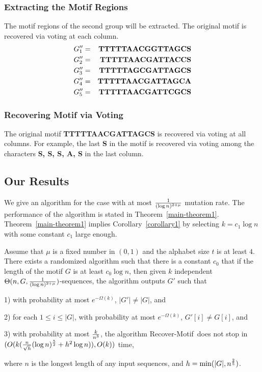 \documentclass[11pt]{article}
\newcommand{\algmnam}{Recover-Motif}
\begin{document}
\subsubsection{Extracting the Motif Regions}

The motif regions of the second group will be extracted. The
original motif is recovered via voting at each column.
\begin{eqnarray*}
G_1''&=&{\Large\bf TTTTTAACG{\small{G} }TTAGCS}\\
G_2''&=&{\Large\bf TTTTTAACGATTA{\small{C}}CS}\\
G_3''&=&{\Large\bf TTTTTA{\small{G}}CGATTAGCS}\\
G_4''&=&{\Large\bf TTTTTAACGATTAGC{\small{A}}}\\
G_5''&=&{\Large\bf TTTTTAACGATT{\small{C}}GCS}
\end{eqnarray*}


\subsubsection{Recovering Motif via Voting}

The original motif {\bf TTTTTAACGATTAGCS} is recovered via voting at
all columns. For example, the last {\bf S} in the motif is recovered
via voting among the characters {\bf S, S, S, A, S} in the last
column.

\subsection{Our Results}

We give an algorithm for the case with at most ${1\over (\log
n)^{2+\mu}}$ mutation rate. The performance of the algorithm is
stated in Theorem~\ref{main-theorem1}. Theorem~\ref{main-theorem1}
implies Corollary~\ref{corollary1} by selecting $k=c_1\log n$ with
some constant $c_1$ large enough.



\begin{theorem}\label{main-theorem1}Assume that $\mu$ is a fixed number in $(0,1)$
and the alphabet size $t$ is at least $4$. There exists a randomized
algorithm such that there is a constant $c_0$ that
 if the length of the motif $G$ is at least $c_0\log n$,
then given $k$ independent $\Theta(n,G,{1\over (\log
n)^{2+\mu}})$-sequences, the algorithm outputs $G'$ such that

1) with probability at most $e^{-\Omega(k)}$, $|G'|\not=|G|$, and

2) for each $1\le i\le |G|$, with probability at most
$e^{-\Omega(k)}$, $G'[i]\not=G[i]$, and

3) with probability at most ${k\over n^3}$, the algorithm
\algmnam~does not stop in $(O(k({n\over \sqrt{h}}(\log n)^{5\over
2}+h^2\log n)), O(k))$ time,

 where $n$ is the longest length of any input
sequences, and $h=\min(|G|,n^{2\over 5})$.
\end{theorem}
\end{document}
